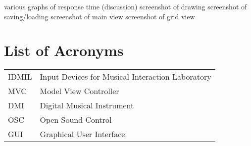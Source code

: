 \documentclass [12pt,letterpaper]{report}
\begin{document}
\tableofcontents
\listoffigures
	various graphs of response time (discussion)
	screenshot of drawing
	screenshot of saving/loading
	screenshot of main view
	screenshot of grid view
\listoftables

\newpage
\chapter*{List of Acronyms}

\begin{longtable}{ll}
    IDMIL	& 	Input Devices for Musical Interaction Laboratory\\ 
    MVC 	& 	Model View Controller\\
    DMI 	& 	Digital Musical Instrument\\
    OSC 	& 	Open Sound Control\\
    GUI		& 	Graphical User Interface
\end{longtable}

\cleardoublepage
{}

%
%
\typeout{}

%
\typeout{}

%
\typeout{}

%
\typeout{}

%
\typeout{}




%
%

\typeout{}
\begin{singlespace}
    
    
\end{singlespace}
\end{document}
